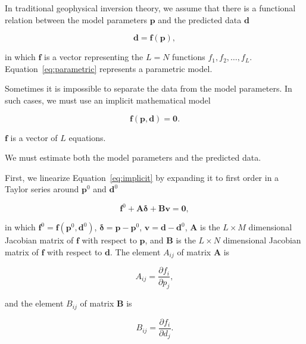 \documentclass[onecolumn]{article}
\begin{document}
In traditional geophysical inversion theory,
we assume that there is a functional relation between
the model parameters $\mathbf{p}$
and the predicted data $\mathbf{d}$

\begin{equation}
    \mathbf{d} = \mathbf{f}(\mathbf{p}),
    \label{eq:parametric}
\end{equation}

\noindent
in which $\mathbf{f}$ is a vector representing the $L = N$ functions
$f_1, f_2, \ldots, f_L$.
Equation~\ref{eq:parametric} represents a parametric model.



Sometimes it is impossible to separate the data from the model parameters.
In such cases,
we must use an implicit mathematical model

\begin{equation}
    \mathbf{f}(\mathbf{p}, \mathbf{d}) = \mathbf{0}.
    \label{eq:implicit}
\end{equation}

$\mathbf{f}$ is a vector of $L$ equations.

We must estimate both the model parameters and the predicted data.

First, we linearize Equation~\ref{eq:implicit} by expanding it to first order
in a Taylor series around $\mathbf{p}^0$ and $\mathbf{d}^0$

\begin{equation}
    \mathbf{f}^0 + \mathbf{A}\mathbf{\delta} + \mathbf{B}\mathbf{v} =
    \mathbf{0},
    \label{eq:implicit-taylor}
\end{equation}

\noindent
in which
$\mathbf{f}^0 = \mathbf{f}(\mathbf{p}^0, \mathbf{d}^0)$,
$\mathbf{\delta} = \mathbf{p} - \mathbf{p}^0$,
$\mathbf{v} = \mathbf{d} - \mathbf{d}^0$,
$\mathbf{A}$ is
the $L \times M$ dimensional Jacobian matrix of $\mathbf{f}$
with respect to $\mathbf{p}$,
and
$\mathbf{B}$ is
the $L \times N$ dimensional Jacobian matrix of $\mathbf{f}$
with respect to $\mathbf{d}$.
The element $A_{ij}$ of matrix $\mathbf{A}$ is

\begin{equation}
    A_{ij} = \dfrac{\partial f_i}{\partial p_j},
    \label{eq:A}
\end{equation}

\noindent
and the element $B_{ij}$ of matrix $\mathbf{B}$ is

\begin{equation}
    B_{ij} = \dfrac{\partial f_i}{\partial d_j}.
    \label{eq:B}
\end{equation}
\end{document}

